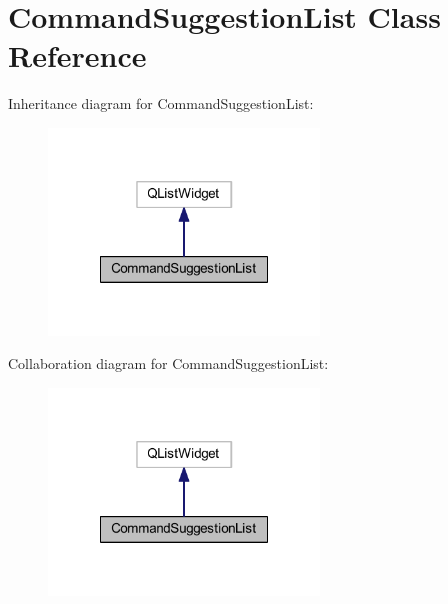 \hypertarget{class_command_suggestion_list}{\section{Command\-Suggestion\-List Class Reference}
\label{class_command_suggestion_list}
}


Inheritance diagram for Command\-Suggestion\-List\-:\nopagebreak
\begin{figure}[H]
\begin{center}
\leavevmode
\includegraphics[width=204pt]{class_command_suggestion_list__inherit__graph}
\end{center}
\end{figure}


Collaboration diagram for Command\-Suggestion\-List\-:\nopagebreak
\begin{figure}[H]
\begin{center}
\leavevmode
\includegraphics[width=204pt]{class_command_suggestion_list__coll__graph}
\end{center}
\end{figure}
